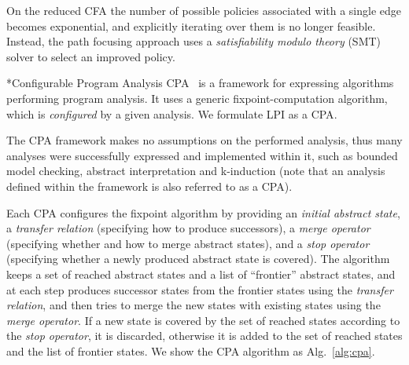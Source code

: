 \documentclass{llncs}
\makeatletter
\newcommand{\cfa}{\textsc{CFA}\xspace}
\renewcommand{\paragraph}{\@startsection{paragraph}{4}{\z@}{0.8ex \@plus 0ex \@minus 1ex}{-1em}{\normalfont\normalsize\bfseries}}
\makeatother
\begin{document}
On the reduced \cfa the number of possible policies associated with a single
edge becomes exponential,
and explicitly iterating over them is no longer feasible.
Instead, the path focusing approach uses a \emph{satisfiability modulo theory}
(SMT) solver to select an improved policy.

\paragraph*{Configurable Program Analysis}
\textsc{CPA}~\cite{cpa} is a framework for expressing algorithms performing
program analysis.
It uses a generic fixpoint-computation algorithm,
which is \emph{configured} by a given analysis.
We formulate LPI as a \textsc{CPA}.

The \textsc{CPA} framework makes no assumptions on the performed analysis,
thus many analyses were successfully expressed and implemented
within it, such as bounded model checking, abstract
interpretation and k-induction (note that an analysis defined within the framework is
also referred to as a \textsc{CPA}).

Each \textsc{CPA} configures the fixpoint algorithm by providing
an \emph{initial abstract state}, a \emph{transfer relation}
(specifying how to produce successors),
a \emph{merge operator} (specifying whether and how to merge abstract states),
and a \emph{stop operator} (specifying whether a newly produced abstract state is
covered).
The algorithm keeps a set of reached abstract states and a list of ``frontier''
abstract states,
and at each step produces successor states from the frontier states using the \emph{transfer relation},
and then tries to merge the new states with existing states using the
\emph{merge operator}.
If a new state is covered by the set of reached states
according to the \emph{stop operator},
it is discarded, otherwise it is added to the set of reached states
and the list of frontier states.
We show the CPA algorithm as Alg.~\ref{alg:cpa}.
\end{document}

